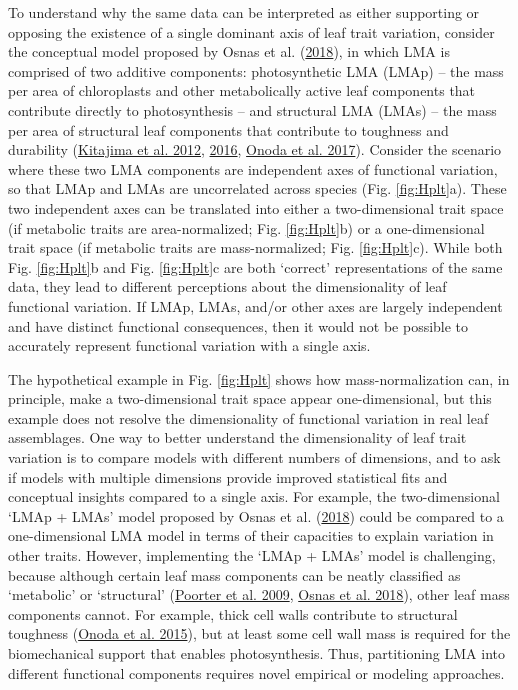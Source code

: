 \documentclass[
  12pt,
]{article}
\begin{document}
To understand why the same data can be interpreted as either supporting or opposing the existence of a single dominant axis of leaf trait variation, consider the conceptual model proposed by Osnas et al. (\protect\hyperlink{ref-Osnas2018}{2018}), in which LMA is comprised of two additive components:
photosynthetic LMA (LMAp) -- the mass per area of chloroplasts and other metabolically active leaf components that contribute directly to photosynthesis -- and structural LMA (LMAs) -- the mass per area of structural leaf components that contribute to toughness and durability (\protect\hyperlink{ref-Kitajima2012}{Kitajima et al. 2012}, \protect\hyperlink{ref-Kitajima2016}{2016}, \protect\hyperlink{ref-Onoda2017}{Onoda et al. 2017}).
Consider the scenario where these two LMA components are independent axes of functional variation, so that LMAp and LMAs are uncorrelated across species (Fig. \ref{fig:Hplt}a).
These two independent axes can be translated into either a two-dimensional trait space (if metabolic traits are area-normalized; Fig. \ref{fig:Hplt}b) or a one-dimensional trait space (if metabolic traits are mass-normalized; Fig. \ref{fig:Hplt}c).
While both Fig. \ref{fig:Hplt}b and Fig. \ref{fig:Hplt}c are both `correct' representations of the same data, they lead to different perceptions about the dimensionality of leaf functional variation.
If LMAp, LMAs, and/or other axes are largely independent and have distinct functional consequences, then it would not be possible to accurately represent functional variation with a single axis.

The hypothetical example in Fig. \ref{fig:Hplt} shows how mass-normalization can, in principle, make a two-dimensional trait space appear one-dimensional, but this example does not resolve the dimensionality of functional variation in real leaf assemblages.
One way to better understand the dimensionality of leaf trait variation is to compare models with different numbers of dimensions, and to ask if models with multiple dimensions provide improved statistical fits and conceptual insights compared to a single axis.
For example, the two-dimensional `LMAp + LMAs' model proposed by Osnas et al. (\protect\hyperlink{ref-Osnas2018}{2018}) could be compared to a one-dimensional LMA model in terms of their capacities to explain variation in other traits.
However, implementing the `LMAp + LMAs' model is challenging, because although certain leaf mass components can be neatly classified as `metabolic' or `structural' (\protect\hyperlink{ref-Poorter2009}{Poorter et al. 2009}, \protect\hyperlink{ref-Osnas2018}{Osnas et al. 2018}), other leaf mass components cannot.
For example, thick cell walls contribute to structural toughness (\protect\hyperlink{ref-Onoda2015}{Onoda et al. 2015}), but at least some cell wall mass is required for the biomechanical support that enables photosynthesis.
Thus, partitioning LMA into different functional components requires novel empirical or modeling approaches.
\end{document}
